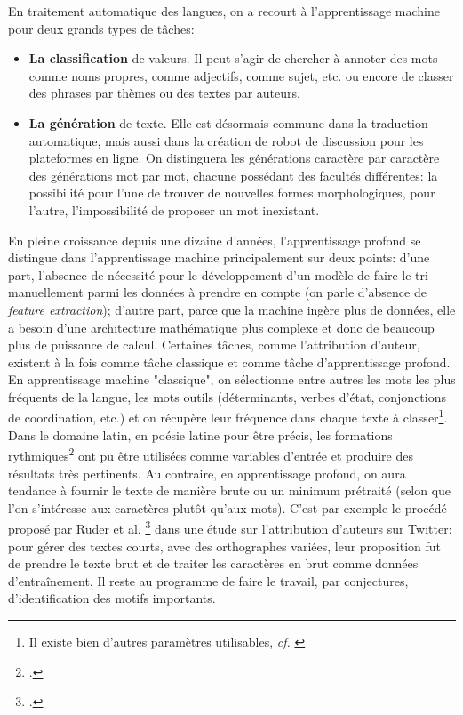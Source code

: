 En traitement automatique des langues, on a recourt à l'apprentissage machine pour deux grands types de tâches:
\begin{itemize}
    \item \textbf{La classification} de valeurs. Il peut s'agir de chercher à annoter des mots comme noms propres, comme adjectifs, comme sujet, etc. ou encore de classer des phrases par thèmes ou des textes par auteurs.
    \item \textbf{La génération} de texte. Elle est désormais commune dans la traduction automatique, mais aussi dans la création de robot de discussion pour les plateformes en ligne. On distinguera les générations caractère par caractère des générations mot par mot, chacune possédant des facultés différentes: la possibilité pour l'une de trouver de nouvelles formes morphologiques, pour l'autre, l'impossibilité de proposer un mot inexistant.
\end{itemize}{}

En pleine croissance depuis une dizaine d'années, l'apprentissage profond se distingue dans l'apprentissage machine principalement sur deux points: d'une part, l'absence de nécessité pour le développement d'un modèle de faire le tri manuellement parmi les données à prendre en compte (on parle d'absence de \textit{feature extraction}); d'autre part, parce que la machine ingère plus de données, elle a besoin d'une architecture mathématique plus complexe et donc de beaucoup plus de puissance de calcul. Certaines tâches, comme l'attribution d'auteur, existent à la fois comme tâche classique et comme tâche d'apprentissage profond. En apprentissage machine "classique", on sélectionne entre autres les mots les plus fréquents de la langue, les mots outils (déterminants, verbes d'état, conjonctions de coordination, etc.) et on récupère leur fréquence dans chaque texte à classer\footnote{Il existe bien d'autres paramètres utilisables, \textit{cf.} \cite{Cafieroeaax5489}}. Dans le domaine latin, en poésie latine pour être précis, les formations rythmiques\footcite{nagy_metre_nodate} ont pu être utilisées comme variables d'entrée et produire des résultats très pertinents. Au contraire, en apprentissage profond, on aura tendance à fournir le texte de manière brute ou un minimum prétraité (selon que l'on s'intéresse aux caractères plutôt qu'aux mots). C'est par exemple le procédé proposé par Ruder et al. \footcite{ruder_character-level_2016} dans une étude sur l'attribution d'auteurs sur Twitter: pour gérer des textes courts, avec des orthographes variées, leur proposition fut de prendre le texte brut et de traiter les caractères en brut comme données d'entraînement. Il reste au programme de faire le travail, par conjectures, d'identification des motifs importants.

